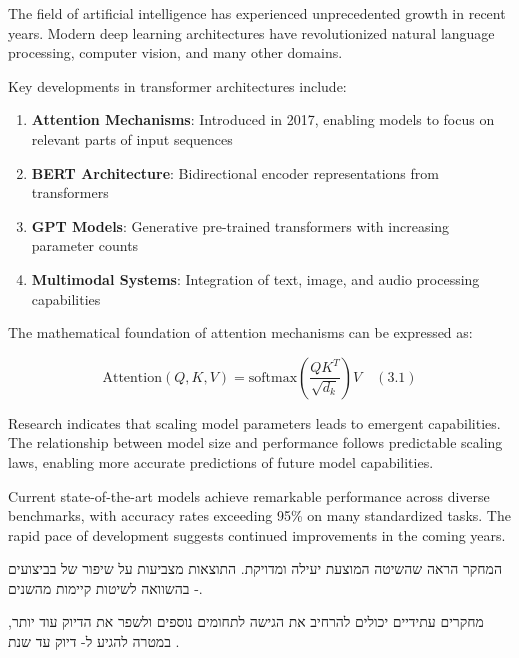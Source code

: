 \documentclass{hebrew-academic-template}
\begin{document}
The field of artificial intelligence has experienced unprecedented growth in recent years. Modern deep learning architectures have revolutionized natural language processing, computer vision, and many other domains.

Key developments in transformer architectures include:

\begin{enumerate}
\item \textbf{Attention Mechanisms}: Introduced in 2017, enabling models to focus on relevant parts of input sequences
\item \textbf{BERT Architecture}: Bidirectional encoder representations from transformers
\item \textbf{GPT Models}: Generative pre-trained transformers with increasing parameter counts
\item \textbf{Multimodal Systems}: Integration of text, image, and audio processing capabilities
\end{enumerate}

The mathematical foundation of attention mechanisms can be expressed as:

$$\text{Attention}(Q, K, V) = \text{softmax}\left(\frac{QK^T}{\sqrt{d_k}}\right)V \quad (3.1)$$

Research indicates that scaling model parameters leads to emergent capabilities. The relationship between model size and performance follows predictable scaling laws, enabling more accurate predictions of future model capabilities.

Current state-of-the-art models achieve remarkable performance across diverse benchmarks, with accuracy rates exceeding 95\% on many standardized tasks. The rapid pace of development suggests continued improvements in the coming years.

\stopenglish



המחקר הראה שהשיטה המוצעת יעילה ומדויקת. התוצאות מצביעות על שיפור של  בביצועים בהשוואה לשיטות קיימות מהשנים -.

מחקרים עתידיים יכולים להרחיב את הגישה לתחומים נוספים ולשפר את הדיוק עוד יותר, במטרה להגיע ל- דיוק עד שנת .


\newpage
\printenglishbibliography
\end{document}
